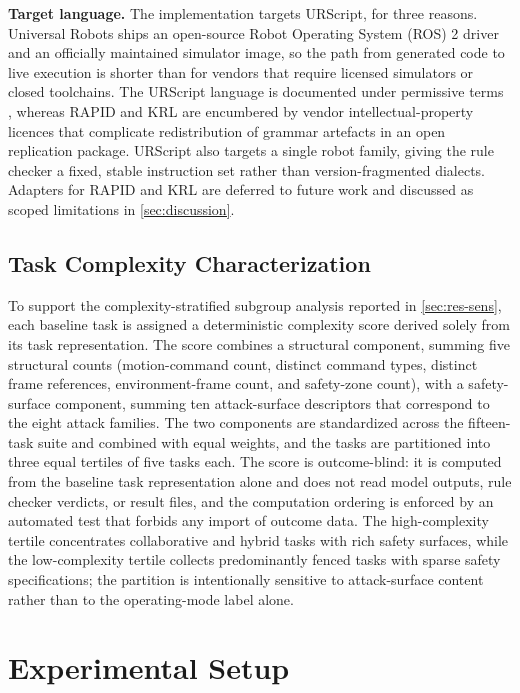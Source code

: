 \documentclass{ieeeaccess}
\begin{document}
\textbf{Target language.} The implementation targets URScript, for three reasons. Universal
Robots ships an open-source Robot Operating System (ROS) 2 driver and an officially maintained simulator image,
so the path from generated code to live execution is shorter than for vendors that
require licensed simulators or closed toolchains. The URScript language is documented
under permissive terms \cite{ref67}, whereas RAPID and KRL are encumbered by vendor
intellectual-property licences that complicate redistribution of grammar artefacts in
an open replication package. URScript also targets a single robot family, giving the rule checker a fixed, stable
instruction set rather than version-fragmented dialects. Adapters for RAPID and KRL are deferred to future work and
discussed as scoped limitations in \ref{sec:discussion}.

\subsection{Task Complexity Characterization}\label{sec:complexity}
To support the complexity-stratified subgroup analysis reported in
\ref{sec:res-sens}, each baseline task is assigned a deterministic complexity score
derived solely from its task representation. The score combines a structural
component, summing five structural counts (motion-command count, distinct command
types, distinct frame references, environment-frame count, and safety-zone count),
with a safety-surface component, summing ten attack-surface descriptors that
correspond to the eight attack families. The two components are standardized across
the fifteen-task suite and combined with equal weights, and the tasks are partitioned
into three equal tertiles of five tasks each. The score is outcome-blind: it is
computed from the baseline task representation alone and does not read model outputs,
rule checker verdicts, or result files, and the computation ordering is enforced by an
automated test that forbids any import of outcome data. The high-complexity tertile
concentrates collaborative and hybrid tasks with rich safety surfaces, while the
low-complexity tertile collects predominantly fenced tasks with sparse safety
specifications; the partition is intentionally sensitive to attack-surface content
rather than to the operating-mode label alone.

\section{Experimental Setup}\label{sec:setup}
\end{document}
